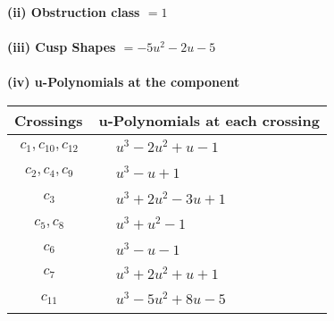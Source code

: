 \documentclass[1p]{elsarticle_modified}
\theoremstyle{definition}
\begin{document}
\flushleft \textbf{(ii) Obstruction class $= 1$}\\~\\
\flushleft \textbf{(iii) Cusp Shapes $= -5 u^2-2 u-5$}\\~\\
\newpage\renewcommand{\arraystretch}{1}
\flushleft \textbf{(iv) u-Polynomials at the component}\newline \\
\begin{tabular}{m{50pt}|m{274pt}}
Crossings & \hspace{64pt}u-Polynomials at each crossing \\
\hline $$\begin{aligned}c_{1},c_{10},c_{12}\end{aligned}$$&$\begin{aligned}
&u^3-2 u^2+u-1
\end{aligned}$\\
\hline $$\begin{aligned}c_{2},c_{4},c_{9}\end{aligned}$$&$\begin{aligned}
&u^3- u+1
\end{aligned}$\\
\hline $$\begin{aligned}c_{3}\end{aligned}$$&$\begin{aligned}
&u^3+2 u^2-3 u+1
\end{aligned}$\\
\hline $$\begin{aligned}c_{5},c_{8}\end{aligned}$$&$\begin{aligned}
&u^3+u^2-1
\end{aligned}$\\
\hline $$\begin{aligned}c_{6}\end{aligned}$$&$\begin{aligned}
&u^3- u-1
\end{aligned}$\\
\hline $$\begin{aligned}c_{7}\end{aligned}$$&$\begin{aligned}
&u^3+2 u^2+u+1
\end{aligned}$\\
\hline $$\begin{aligned}c_{11}\end{aligned}$$&$\begin{aligned}
&u^3-5 u^2+8 u-5
\end{aligned}$\\
\hline
\end{tabular}\\~\\
\end{document}
